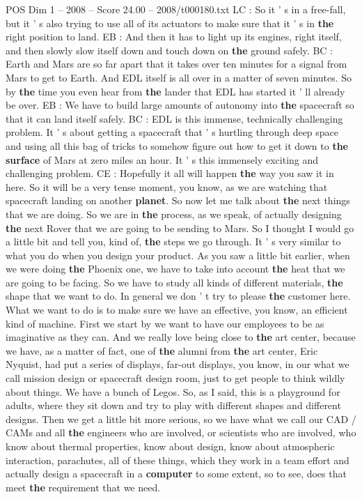 \begin{textsample}{POS Dim 1 – 2008 – Score 24.00 – 2008/t000180.txt}
LC : So it ' s in a free-fall, but it ' s also trying to use all of its actuators to make sure that it ' s in \textbf{the} right position to land.
EB : And then it has to light up its engines, right itself, and then slowly slow itself down and touch down on \textbf{the} ground safely.
BC : Earth and Mars are so far apart that it takes over ten minutes for a signal from Mars to get to Earth.
And EDL itself is all over in a matter of seven minutes.
So by \textbf{the} time you even hear from \textbf{the} lander that EDL has started it ' ll already be over.
EB : We have to build large amounts of autonomy into \textbf{the} spacecraft so that it can land itself safely.
BC : EDL is this immense, technically challenging problem.
It ' s about getting a spacecraft that ' s hurtling through deep space and using all this bag of tricks to somehow figure out how to get it down to \textbf{the} \textbf{surface} of Mars at zero miles an hour.
It ' s this immensely exciting and challenging problem.
CE : Hopefully it all will happen \textbf{the} way you saw it in here.
So it will be a very tense moment, you know, as we are watching that spacecraft landing on another \textbf{planet}.
So now let me talk about \textbf{the} next things that we are doing.
So we are in \textbf{the} process, as we speak, of actually designing \textbf{the} next Rover that we are going to be sending to Mars.
So I thought I would go a little bit and tell you, kind of, \textbf{the} steps we go through.
It ' s very similar to what you do when you design your product.
As you saw a little bit earlier, when we were doing \textbf{the} Phoenix one, we have to take into account \textbf{the} heat that we are going to be facing.
So we have to study all kinds of different materials, \textbf{the} shape that we want to do.
In general we don ' t try to please \textbf{the} customer here.
What we want to do is to make sure we have an effective, you know, an efficient kind of machine.
First we start by we want to have our employees to be as imaginative as they can.
And we really love being close to \textbf{the} art center, because we have, as a matter of fact, one of \textbf{the} alumni from \textbf{the} art center, Eric Nyquist, had put a series of displays, far-out displays, you know, in our what we call mission design or spacecraft design room, just to get people to think wildly about things.
We have a bunch of Legos.
So, as I said, this is a playground for adults, where they sit down and try to play with different shapes and different designs.
Then we get a little bit more serious, so we have what we call our CAD / CAMs and all \textbf{the} engineers who are involved, or scientists who are involved, who know about thermal properties, know about design, know about atmospheric interaction, parachutes, all of these things, which they work in a team effort and actually design a spacecraft in a \textbf{computer} to some extent, so to see, does that meet \textbf{the} requirement that we need.

\end{textsample}
